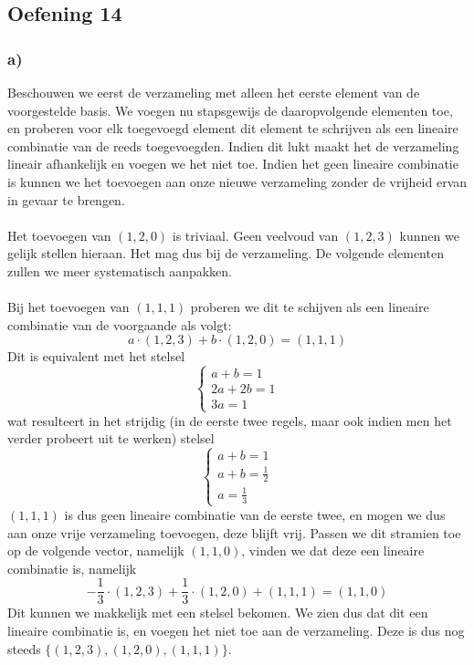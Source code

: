 \documentclass[lineaire_algebra_oplossingen.tex]{subfiles}
\begin{document}
\subsection{Oefening 14}

\subsubsection*{a)}
Beschouwen we eerst de verzameling met alleen het eerste element van de voorgestelde basis. We voegen nu stapsgewijs de daaropvolgende elementen toe, en proberen voor elk toegevoegd element dit element te schrijven als een lineaire combinatie van de reeds toegevoegden. Indien dit lukt maakt het de verzameling lineair afhankelijk en voegen we het niet toe. Indien het geen lineaire combinatie is kunnen we het toevoegen aan onze nieuwe verzameling zonder de vrijheid ervan in gevaar te brengen.\\\\
Het toevoegen van $(1,2,0)$ is triviaal. Geen veelvoud van $(1,2,3)$ kunnen we gelijk stellen hieraan. Het mag dus bij de verzameling. De volgende elementen zullen we meer systematisch aanpakken.\\\\
Bij het toevoegen van $(1,1,1)$ proberen we dit te schijven als een lineaire combinatie van de voorgaande als volgt:
\[
a \cdot (1,2,3) + b \cdot (1,2,0) = (1,1,1)
\]
Dit is equivalent met het stelsel
\[
\left\{
\begin{array}{l}
a + b = 1\\
2a + 2b = 1\\
3a = 1
\end{array} \right.
\]
wat resulteert in het strijdig (in de eerste twee regels, maar ook indien men het verder probeert uit te werken) stelsel
\[
\left\{
\begin{array}{l}
a + b = 1\\
a + b = \frac{1}{2}\\
a = \frac{1}{3}
\end{array} \right.
\]
$(1,1,1)$ is dus geen lineaire combinatie van de eerste twee, en mogen we dus aan onze vrije verzameling toevoegen, deze blijft vrij. Passen we dit stramien toe op de volgende vector, namelijk $(1,1,0)$, vinden we dat deze een lineaire combinatie is, namelijk
\[
-\frac{1}{3} \cdot (1,2,3) + \frac{1}{3} \cdot (1,2,0) + (1,1,1) = (1,1,0)
\]
Dit kunnen we makkelijk met een stelsel bekomen. We zien dus dat dit een lineaire combinatie is, en voegen het niet toe aan de verzameling. Deze is dus nog steeds $\{(1,2,3), (1,2,0), (1,1,1)\}$.\\
\end{document}
